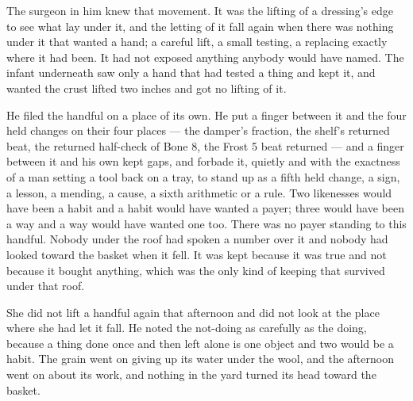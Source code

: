 The surgeon in him knew that movement. It was the lifting of a dressing's edge to see what lay under it, and the letting of it fall again when there was nothing under it that wanted a hand; a careful lift, a small testing, a replacing exactly where it had been. It had not exposed anything anybody would have named. The infant underneath saw only a hand that had tested a thing and kept it, and wanted the crust lifted two inches and got no lifting of it.

He filed the handful on a place of its own. He put a finger between it and the four held changes on their four places --- the damper's fraction, the shelf's returned beat, the returned half-check of Bone 8, the Frost 5 beat returned --- and a finger between it and his own kept gaps, and forbade it, quietly and with the exactness of a man setting a tool back on a tray, to stand up as a fifth held change, a sign, a lesson, a mending, a cause, a sixth arithmetic or a rule. Two likenesses would have been a habit and a habit would have wanted a payer; three would have been a way and a way would have wanted one too. There was no payer standing to this handful. Nobody under the roof had spoken a number over it and nobody had looked toward the basket when it fell. It was kept because it was true and not because it bought anything, which was the only kind of keeping that survived under that roof.

She did not lift a handful again that afternoon and did not look at the place where she had let it fall. He noted the not-doing as carefully as the doing, because a thing done once and then left alone is one object and two would be a habit. The grain went on giving up its water under the wool, and the afternoon went on about its work, and nothing in the yard turned its head toward the basket.

\scenebreak

